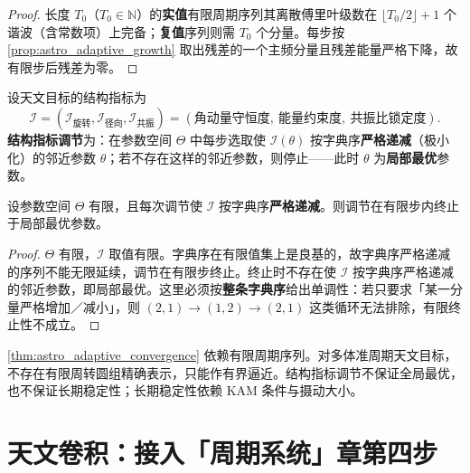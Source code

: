 \begin{proof}
长度 $T_0$（$T_0\in\mathbb N$）的\textbf{实值}有限周期序列其离散傅里叶级数在 $\lfloor T_0/2\rfloor+1$ 个谐波（含常数项）上完备；\textbf{复值}序列则需 $T_0$ 个分量。每步按 \cref{prop:astro_adaptive_growth} 取出残差的一个主频分量且残差能量严格下降，故有限步后残差为零。
\end{proof}

\begin{definition}[结构指标调节]\label{def:astro_structure_metric_adjustment}
设天文目标的结构指标为
\[
\mathcal I=(\mathcal I_{\mathrm{旋转}},\mathcal I_{\mathrm{径向}},\mathcal I_{\mathrm{共振}})
=(\text{角动量守恒度},\ \text{能量约束度},\ \text{共振比锁定度}).
\]
\textbf{结构指标调节}为：在参数空间 $\Theta$ 中每步选取使 $\mathcal I(\theta)$ 按字典序\textbf{严格递减}（极小化）的邻近参数 $\theta$；若不存在这样的邻近参数，则停止——此时 $\theta$ 为\textbf{局部最优}参数。
\end{definition}

\begin{proposition}[结构指标调节的有限收敛]\label{prop:astro_structure_metric_convergence}
设参数空间 $\Theta$ 有限，且每次调节使 $\mathcal I$ 按字典序\textbf{严格递减}。则调节在有限步内终止于局部最优参数。
\end{proposition}

\begin{proof}
$\Theta$ 有限，$\mathcal I$ 取值有限。字典序在有限值集上是良基的，故字典序严格递减的序列不能无限延续，调节在有限步终止。终止时不存在使 $\mathcal I$ 按字典序严格递减的邻近参数，即局部最优。这里必须按\textbf{整条字典序}给出单调性：若只要求「某一分量严格增加／减小」，则 $(2,1)\to(1,2)\to(2,1)$ 这类循环无法排除，有限终止性不成立。
\end{proof}

\begin{remark}[动态调节的边界]\label{rem:astro_adaptive_boundary}
\cref{thm:astro_adaptive_convergence} 依赖有限周期序列。对多体准周期天文目标，不存在有限周转圆组精确表示，只能作有界逼近。结构指标调节不保证全局最优，也不保证长期稳定性；长期稳定性依赖 KAM 条件与摄动大小。
\end{remark}

\section{天文卷积：接入「周期系统」章第四步}
\label{sec:astro_convolution}

